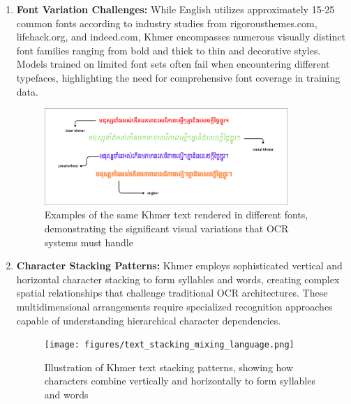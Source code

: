 \begin{enumerate}
    \item \textbf{Font Variation Challenges:} While English utilizes approximately 15-25 common fonts according to industry studies from rigorousthemes.com, lifehack.org, and indeed.com, Khmer encompasses numerous visually distinct font families ranging from bold and thick to thin and decorative styles. Models trained on limited font sets often fail when encountering different typefaces, highlighting the need for comprehensive font coverage in training data.
    
        \begin{figure}[H]
            \centering
            \includegraphics[width=0.87\textwidth]{figures/varianty_of_font.png}
            \begin{minipage}{0.87\textwidth}
                \caption{Examples of the same Khmer text rendered in different fonts, demonstrating the significant visual variations that OCR systems must handle}
                \label{fig:font_variants}
            \end{minipage}
        \end{figure}
 
    \item \textbf{Character Stacking Patterns:} Khmer employs sophisticated vertical and horizontal character stacking to form syllables and words, creating complex spatial relationships that challenge traditional OCR architectures. These multidimensional arrangements require specialized recognition approaches capable of understanding hierarchical character dependencies.
    
        \begin{figure}[H]
            \centering
            \texttt{[image: figures/text\_stacking\_mixing\_language.png]}
            \begin{minipage}{0.87\textwidth}
                \caption{Illustration of Khmer text stacking patterns, showing how characters combine vertically and horizontally to form syllables and words \citep{buoy2023khmerocr}}
                \label{fig:text_stacking}
            \end{minipage}
        \end{figure}
 \end{enumerate}


